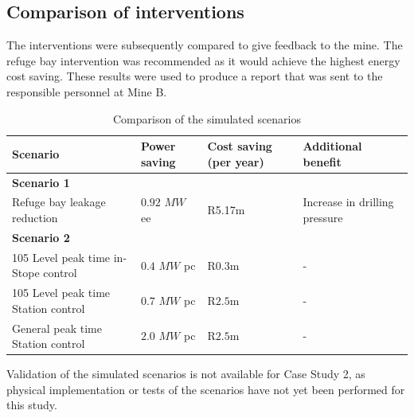 	\subsection{Comparison of interventions}
	The interventions were subsequently compared to give feedback to the mine. The refuge bay intervention was recommended as it would achieve the highest energy cost saving. These results were used to produce a report that was sent to the responsible personnel at Mine B.
	\\
	\begin{table}[h!]
		\caption{Comparison of the simulated scenarios}
		\centering
		\begin{tabular}{p{}
				p{}
				p{}
				p{}}
			\hline 
			 \vspace{0.5em}Scenario & \vspace{0.5em}Power saving & \vspace{0.5em}Cost saving (per year) & \vspace{0.5em}Additional benefit \\
			\hline
			\multicolumn{4}{l}{\textbf{Scenario 1}} \\
			Refuge bay leakage reduction & $ 0.92 $ $MW$ \gls{ee} & R5.17m & Increase in drilling pressure \\
			 
			\multicolumn{4}{l}{\textbf{Scenario 2}} \\
			105 Level peak time in-Stope control & $ 0.4 $ $MW$ \gls{pc} & R$ 0.3 $m& - \\
			105 Level peak time Station control & $ 0.7 $ $MW$ \gls{pc} & R$ 2.5 $m& - \\
			General peak time Station control & $ 2.0 $ $MW$ \gls{pc} & R$ 2.5 $m& - \\
			\hline 
		\end{tabular}
		\label{Table: B Comparison}
	\end{table}
\par
Validation of the simulated scenarios is not available for Case Study 2, as physical implementation or tests of the scenarios have not yet been performed for this study.
